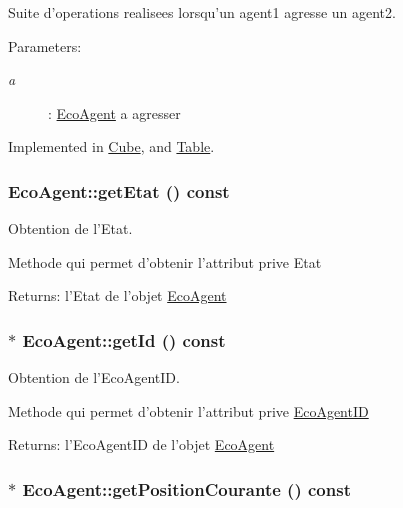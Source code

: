Suite d'operations realisees lorsqu'un agent1 agresse un agent2. 

\begin{Desc}
\item[Parameters:]
\begin{description}
\item[{\em a}]: \hyperlink{classEcoAgent}{EcoAgent} a agresser \end{description}
\end{Desc}


Implemented in \hyperlink{classCube_85556598281efcfa925dd4ef4c8acba5}{Cube}, and \hyperlink{classTable_e636451a26e8fd61aa9b4c09a92262f7}{Table}.\hypertarget{classEcoAgent_91160732f8c4dd585ac5d8ad69bf3891}{
\subsubsection[{getEtat}]{ EcoAgent::getEtat () const}}
\label{classEcoAgent_91160732f8c4dd585ac5d8ad69bf3891}


Obtention de l'Etat. 

Methode qui permet d'obtenir l'attribut prive Etat

\begin{Desc}
\item[Returns:]l'Etat de l'objet \hyperlink{classEcoAgent}{EcoAgent} \end{Desc}
\hypertarget{classEcoAgent_888101c39bee652681dffcb36bd9bb01}{
\subsubsection[{getId}]{ $\ast$ EcoAgent::getId () const}}
\label{classEcoAgent_888101c39bee652681dffcb36bd9bb01}


Obtention de l'EcoAgentID. 

Methode qui permet d'obtenir l'attribut prive \hyperlink{classEcoAgentID}{EcoAgentID}

\begin{Desc}
\item[Returns:]l'EcoAgentID de l'objet \hyperlink{classEcoAgent}{EcoAgent} \end{Desc}
\hypertarget{classEcoAgent_01733b6103c367848cb4b8477cae5e51}{
\subsubsection[{getPositionCourante}]{ $\ast$ EcoAgent::getPositionCourante () const}}
\label{classEcoAgent_01733b6103c367848cb4b8477cae5e51}


